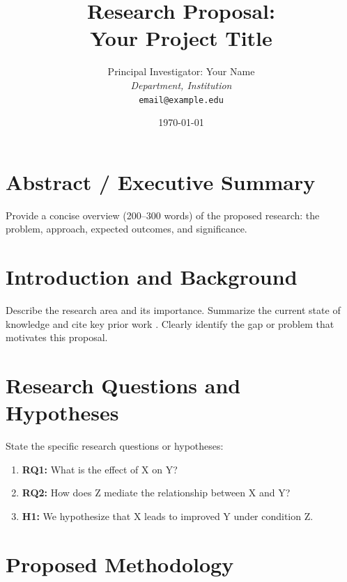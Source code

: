 \documentclass[11pt]{article}
\title{Research Proposal:\\Your Project Title}
\author{
  Principal Investigator: Your Name\\
  \textit{Department, Institution}\\
  \texttt{email@example.edu}
}
\date{\today}
\begin{document}
\maketitle

\section{Abstract / Executive Summary}

Provide a concise overview (200--300 words) of the proposed research:
the problem, approach, expected outcomes, and significance.

\section{Introduction and Background}

Describe the research area and its importance. Summarize the current
state of knowledge and cite key prior work \citep{smith2023,jones2022}.
Clearly identify the gap or problem that motivates this proposal.

\section{Research Questions and Hypotheses}

State the specific research questions or hypotheses:

\begin{enumerate}
  \item \textbf{RQ1:} What is the effect of X on Y?
  \item \textbf{RQ2:} How does Z mediate the relationship between X and Y?
  \item \textbf{H1:} We hypothesize that X leads to improved Y under condition Z.
\end{enumerate}

\section{Proposed Methodology}
\end{document}
